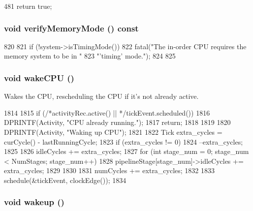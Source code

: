 \begin{DoxyCode}
481 { return true; }
\end{DoxyCode}
\hypertarget{classInOrderCPU_ae2e1ccebe596a180f8105d57f9a93645}{
\subsubsection[{verifyMemoryMode}]{\setlength{\rightskip}{0pt plus 5cm}void verifyMemoryMode () const}}
\label{classInOrderCPU_ae2e1ccebe596a180f8105d57f9a93645}



\begin{DoxyCode}
820 {
821     if (!system->isTimingMode()) {
822         fatal("The in-order CPU requires the memory system to be in "
823               "'timing' mode.\n");
824     }
825 }
\end{DoxyCode}
\hypertarget{classInOrderCPU_abce3a63b123f84972e4df7962f9b870e}{
\subsubsection[{wakeCPU}]{\setlength{\rightskip}{0pt plus 5cm}void wakeCPU ()}}
\label{classInOrderCPU_abce3a63b123f84972e4df7962f9b870e}
Wakes the CPU, rescheduling the CPU if it's not already active. 


\begin{DoxyCode}
1814 {
1815     if (/*activityRec.active() || */tickEvent.scheduled()) {
1816         DPRINTF(Activity, "CPU already running.\n");
1817         return;
1818     }
1819 
1820     DPRINTF(Activity, "Waking up CPU\n");
1821 
1822     Tick extra_cycles = curCycle() - lastRunningCycle;
1823     if (extra_cycles != 0)
1824         --extra_cycles;
1825 
1826     idleCycles += extra_cycles;    
1827     for (int stage_num = 0; stage_num < NumStages; stage_num++) {
1828         pipelineStage[stage_num]->idleCycles += extra_cycles;
1829     }    
1830 
1831     numCycles += extra_cycles;
1832 
1833     schedule(&tickEvent, clockEdge());
1834 }
\end{DoxyCode}
\hypertarget{classInOrderCPU_ae674290a26ecbd622c5160e38e8a4fe9}{
\subsubsection[{wakeup}]{\setlength{\rightskip}{0pt plus 5cm}void wakeup ()}}
\label{classInOrderCPU_ae674290a26ecbd622c5160e38e8a4fe9}


